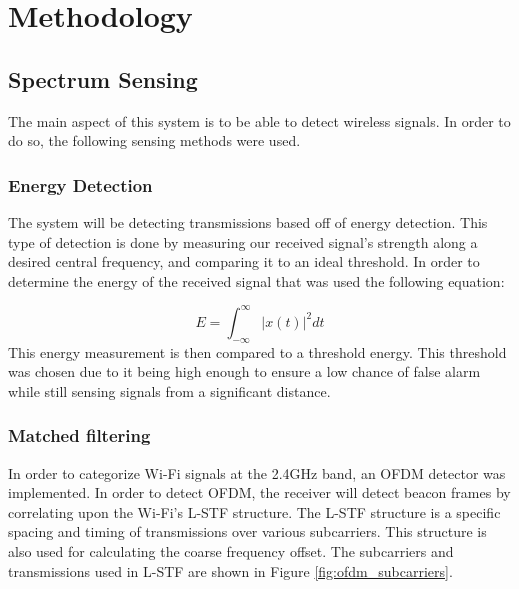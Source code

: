 \chapter{Methodology}
\section{Spectrum Sensing}
The main aspect of this system is to be able to detect wireless signals. In order to do so, the following sensing methods were used.
\subsection{Energy Detection}
The system will be detecting transmissions based off of energy detection. This type of detection is done by measuring our received signal’s strength along a desired central frequency, and comparing it to an ideal threshold. In order to determine the energy of the received signal that was used the following equation:\par 
\[E = \int_{-\infty}^{\infty}| x(t) |^2dt\]
This energy measurement is then compared to a threshold energy. This threshold was chosen due to it being high enough to ensure a low chance of false alarm while still sensing signals from a significant distance. \par 


\subsection{Matched filtering}
In order to categorize Wi-Fi signals at the 2.4GHz band, an OFDM detector was implemented. In order to detect OFDM, the receiver will detect beacon frames by correlating upon the Wi-Fi’s L-STF structure. The L-STF structure is a specific spacing and timing of transmissions over various subcarriers. This structure is also used for calculating the coarse frequency offset. The subcarriers and transmissions used in L-STF are shown in Figure \ref{fig:ofdm_subcarriers}. \par 

